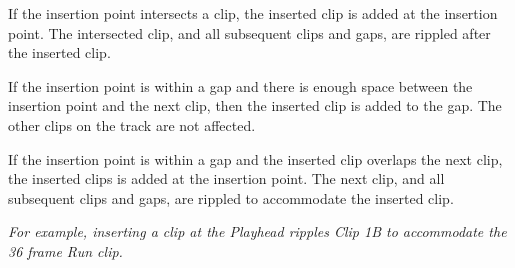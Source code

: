 \begin{DoxyItemize}
\item If the insertion point intersects a clip, the inserted clip is added at the insertion point. The intersected clip, and all subsequent clips and gaps, are rippled after the inserted clip.
\item If the insertion point is within a gap and there is enough space between the insertion point and the next clip, then the inserted clip is added to the gap. The other clips on the track are not affected.
\item If the insertion point is within a gap and the inserted clip overlaps the next clip, the inserted clips is added at the insertion point. The next clip, and all subsequent clips and gaps, are rippled to accommodate the inserted clip.
\end{DoxyItemize}



{\itshape For example, inserting a clip at the  Playhead ripples Clip 1B to accommodate the 36 frame Run clip.} 